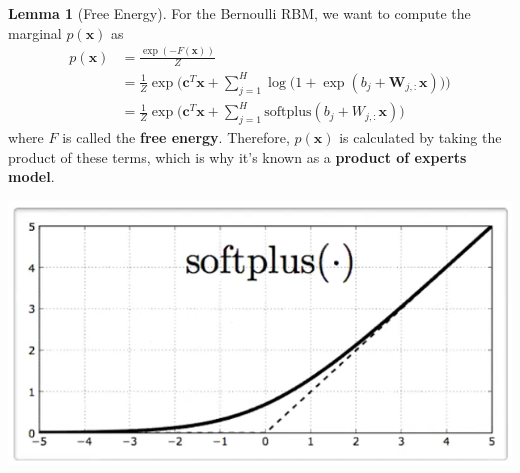 \documentclass{article}
\theoremstyle{definition}
\newtheorem{lemma}[theorem]{Lemma}
\theoremstyle{remark}
\theoremstyle{definition}
\begin{document}
      \begin{lemma}[Free Energy] 
        For the Bernoulli RBM, we want to compute the marginal $p(\mathbf{x})$ as
        \begin{align*} 
        p(\mathbf{x}) & = \frac{\exp(-F(\mathbf{x}))}{Z} \\
                      & = \frac{1}{Z} \exp \bigg( \mathbf{c}^T \mathbf{x} + \sum_{j=1}^H \log \big( 1 + \exp (b_j + \mathbf{W}_{j, :} \mathbf{x}) \big) \bigg) \\
                      & = \frac{1}{Z} \exp \bigg( \mathbf{c}^T \mathbf{x} + \sum_{j=1}^H \mathrm{softplus}(b_j + W_{j, :} \mathbf{x} ) \bigg)
        \end{align*}
        where $F$ is called the \textbf{free energy}. Therefore, $p(\mathbf{x})$ is calculated by taking the product of these terms, which is why it's known as a \textbf{product of experts model}. 
        \begin{center}
        \includegraphics[scale=0.4]{img/softplus.png} 
        \end{center}
      \end{lemma}
\end{document}

